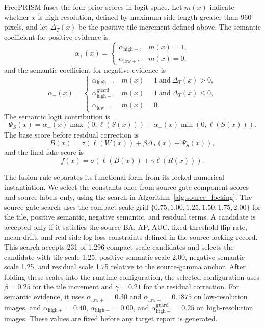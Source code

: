 \documentclass[lettersize,journal]{IEEEtran}
\begin{document}
FreqPRISM fuses the four prior scores in logit space. Let $m(x)$ indicate whether $x$ is high resolution, defined by maximum side length greater than 960 pixels, and let $\Delta_T(x)$ be the positive tile increment defined above. The semantic coefficient for positive evidence is
\begin{equation}
    \alpha_{+}(x)=
    \begin{cases}
    \alpha_{\mathrm{high}+}, & m(x)=1,\\
    \alpha_{\mathrm{low}+}, & m(x)=0,
    \end{cases}
\end{equation}
and the semantic coefficient for negative evidence is
\begin{equation}
    \alpha_{-}(x)=
    \begin{cases}
    \alpha_{\mathrm{high}-}, & m(x)=1 \ \mathrm{and}\ \Delta_T(x)>0,\\
    \alpha_{\mathrm{high}-}^{\mathrm{guard}}, & m(x)=1 \ \mathrm{and}\ \Delta_T(x)\leq 0,\\
    \alpha_{\mathrm{low}-}, & m(x)=0.
    \end{cases}
\end{equation}
The semantic logit contribution is
\begin{equation}
    \Psi_S(x)=\alpha_{+}(x)\max(0,\ell(S(x)))+
    \alpha_{-}(x)\min(0,\ell(S(x))).
\end{equation}
The base score before residual correction is
\begin{equation}
    B(x)=\sigma\left(\ell(W(x))+\beta \Delta_T(x)+\Psi_S(x)\right),
\end{equation}
and the final fake score is
\begin{equation}
    f(x)=\sigma\left(\ell(B(x))+\gamma \ell(R(x))\right).
\end{equation}

The fusion rule separates its functional form from its locked numerical instantiation. We select the constants once from source-gate component scores and source labels only, using the search in Algorithm~\ref{alg:source_locking}. The source-gate search uses the compact scale grid $\{0.75,1.00,1.25,1.50,1.75,2.00\}$ for the tile, positive semantic, negative semantic, and residual terms. A candidate is accepted only if it satisfies the source BA, AP, AUC, fixed-threshold flip-rate, mean-drift, and real-side log-loss constraints defined in the source-locking record. This search accepts 231 of 1,296 compact-scale candidates and selects the candidate with tile scale 1.25, positive semantic scale 2.00, negative semantic scale 1.25, and residual scale 1.75 relative to the source-gamma anchor. After folding these scales into the runtime configuration, the selected configuration uses $\beta=0.25$ for the tile increment and $\gamma=0.21$ for the residual correction. For semantic evidence, it uses $\alpha_{\mathrm{low}+}=0.30$ and $\alpha_{\mathrm{low}-}=0.1875$ on low-resolution images, and $\alpha_{\mathrm{high}+}=0.40$, $\alpha_{\mathrm{high}-}=0.00$, and $\alpha_{\mathrm{high}-}^{\mathrm{guard}}=0.25$ on high-resolution images. These values are fixed before any target report is generated.
\end{document}
